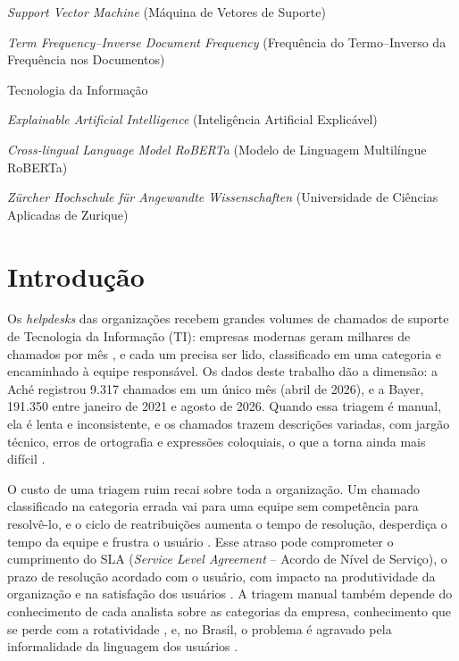 \documentclass[
    12pt,                %
    openright,           %
    oneside,             %
    a4paper,             %
    english,             %
    brazil               %
]{abntex2}
\begin{document}
\begin{siglas}
  \item[SVM] \textit{Support Vector Machine} (Máquina de Vetores de Suporte)
  \item[TF-IDF] \textit{Term Frequency–Inverse Document Frequency} (Frequência do Termo–Inverso da Frequência nos Documentos)
  \item[TI] Tecnologia da Informação
  \item[XAI] \textit{Explainable Artificial Intelligence} (Inteligência Artificial Explicável)
  \item[XLM-RoBERTa] \textit{Cross-lingual Language Model RoBERTa} (Modelo de Linguagem Multilíngue RoBERTa)
  \item[ZHAW] \textit{Zürcher Hochschule für Angewandte Wissenschaften} (Universidade de Ciências Aplicadas de Zurique)
\end{siglas}

\tableofcontents*
\cleardoublepage

\textual

\chapter{Introdução}
\label{cap:introducao}

Os \textit{helpdesks} das organizações recebem grandes volumes de chamados de suporte de Tecnologia da Informação (TI): empresas modernas geram milhares de chamados por mês \cite{razma2026}, e cada um precisa ser lido, classificado em uma categoria e encaminhado à equipe responsável. Os dados deste trabalho dão a dimensão: a Aché registrou 9.317 chamados em um único mês (abril de 2026), e a Bayer, 191.350 entre janeiro de 2021 e agosto de 2026. Quando essa triagem é manual, ela é lenta e inconsistente, e os chamados trazem descrições variadas, com jargão técnico, erros de ortografia e expressões coloquiais, o que a torna ainda mais difícil \cite{zemp2021}.

O custo de uma triagem ruim recai sobre toda a organização. Um chamado classificado na categoria errada vai para uma equipe sem competência para resolvê-lo, e o ciclo de reatribuições aumenta o tempo de resolução, desperdiça o tempo da equipe e frustra o usuário \cite{harun2023}. Esse atraso pode comprometer o cumprimento do SLA (\textit{Service Level Agreement} -- Acordo de Nível de Serviço), o prazo de resolução acordado com o usuário, com impacto na produtividade da organização e na satisfação dos usuários \cite{razma2026}. A triagem manual também depende do conhecimento de cada analista sobre as categorias da empresa, conhecimento que se perde com a rotatividade \cite{wahba2023}, e, no Brasil, o problema é agravado pela informalidade da linguagem dos usuários \cite{pereira2023}.
\end{document}
